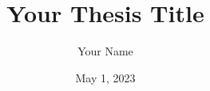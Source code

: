 \documentclass[draft]{cmustatthesis}
\title{Your Thesis Title}
\date{May 1, 2023}
\author{Your Name}
\begin{document}
\frontmatter

\begin{titlingpage}
  

  \cleartorecto

  \maketitle
  \makecopyright

  \cleartorecto
\end{titlingpage}




\cleartorecto
\tableofcontents

\cleartorecto
\listoftables

\cleartorecto
\listoffigures

\mainmatter

\pagestyle{ruled}





\appendix


\end{document}
